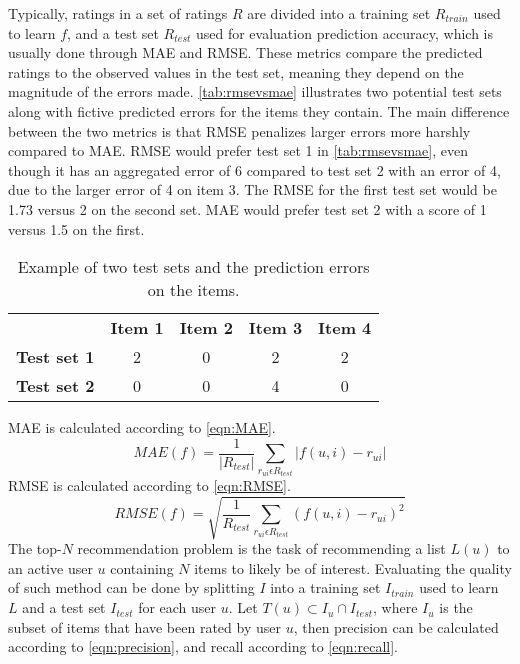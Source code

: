 Typically, ratings in a set of ratings $R$ are divided into a training set $R_{train}$ used to learn $f$, and a test set $R_{test}$ used for evaluation prediction accuracy, which is usually done through MAE and RMSE.
These metrics compare the predicted ratings to the observed values in the test set, meaning they depend on the magnitude of the errors made.
\autoref{tab:rmsevsmae} illustrates two potential test sets along with fictive predicted errors for the items they contain.
The main difference between the two metrics is that RMSE penalizes larger errors more harshly compared to MAE.
RMSE would prefer test set 1 in \autoref{tab:rmsevsmae}, even though it has an aggregated error of 6 compared to test set 2 with an error of 4, due to the larger error of 4 on item 3.
The RMSE for the first test set would be 1.73 versus 2 on the second set.
MAE would prefer test set 2 with a score of 1 versus 1.5 on the first.
\begin{table}[]\centering
    \caption{Example of two test sets and the prediction errors on the items.}\label{tab:rmsevsmae}
    \scriptsize
    \begin{tabular}{ccccc}\toprule
        &\textbf{Item 1} & \textbf{Item 2} & \textbf{Item 3} & \textbf{Item 4}\\\cmidrule{1-5}
        \textbf{Test set 1} & 2 & 0 & 2 & 2 \\\cmidrule{1-5}
        \textbf{Test set 2} & 0 & 0 & 4 & 0  \\\cmidrule{1-5}
    \bottomrule
    \end{tabular}
\end{table}
MAE is calculated according to \autoref{eqn:MAE}.
\begin{equation}
    \label{eqn:MAE}
    MAE(f) = \frac{1}{|R_{test}|} \sum\limits_{r_{ui} \epsilon R_{test}} |f(u,i)-r_{ui}|
\end{equation}
RMSE is calculated according to \autoref{eqn:RMSE}.
\begin{equation}
    \label{eqn:RMSE}
    RMSE(f) = \sqrt{\frac{1}{R_{test}} \sum\limits_{r_{ui} \epsilon R_{test}} (f(u, i) - r_{ui})^2}
\end{equation}
The top-$N$ recommendation problem is the task of recommending a list $L(u)$ to an active user $u$ containing $N$ items to likely be of interest.
Evaluating the quality of such method can be done by splitting $I$ into a training set $I_{train}$ used to learn $L$ and a test set $I_{test}$ for each user $u$.
Let $T(u) \subset I_u \cap I_{test}$, where $I_u$ is the subset of items that have been rated by user $u$, then precision can be calculated according to \autoref{eqn:precision}, and recall according to \autoref{eqn:recall}.
